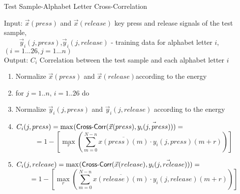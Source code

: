 \begin{algorithm}
	\caption{Test Sample-Alphabet Letter Cross-Correlation} 
	
	\label{CrossCorrelationAlg}
	
	
	
	Input: $\vec{x}(press)$ and $\vec{x}(release)$ key press and release signals of the test sample,\\
	$~~~~~~~~~~\vec{y}_i(j,press)$,$\vec{y}_i(j,release)$ - training data for alphabet letter $i$,
	$(i = 1...26, j = 1...n)$\\ 
	Output: $C_i$ Correlation between the test sample and each alphabet letter $i$\\
	
	\begin{enumerate}
		
		\item Normalize $\vec{x}(press)$ and  $\vec{x}(release)$according to the energy
		
		\item for $j= 1 ..n$, $i = 1 ..26$ do
		
		\item \hspace{5mm} Normalize $\vec{y}_i(j,press)$ and $\vec{y}_i(j,release)$ according to the energy 
		
		\item \hspace{5mm} $C_i(j,press) =  \max_{}(\textsf{Cross\mbox{-}Corr}(\vec{x}(press),\vec{y_i(j,press)}))= $\\
		$$= 1 - \left[\max_{r}(\sum_{m=0}^{N-n}\overline{x(press)(m)} \cdot y_i(j,press)(m+r) )\right]$$
		
		\item \hspace{5mm} $C_i(j,release) =  \max_{}(\textsf{Cross\mbox{-}Corr}(\vec{x}(release),\vec{y_i(j,release)}))=$\\ 
		$$= 1 - \left[\max_{r}(\sum_{m=0}^{N-n}\overline{x(release)(m)} \cdot y_i(j,release)(m+r) )\right]$$
		

\end{enumerate}
\end{algorithm}
